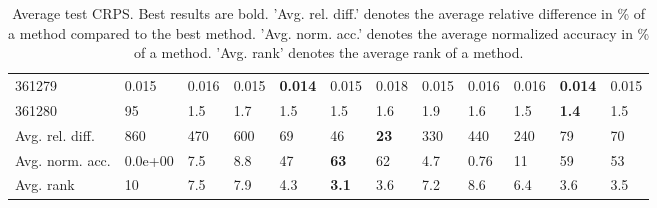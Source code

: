 \begin{table}[ht!]
\begin{tabular}{llllllllllll}
  361279 & 0.015 & 0.016 & 0.015 & \textbf{0.014} & 0.015 & 0.018 & 0.015 & 0.016 & 0.016 & \textbf{0.014} & 0.015 \\ 
  361280 & 95 & 1.5 & 1.7 & 1.5 & 1.5 & 1.6 & 1.9 & 1.6 & 1.5 & \textbf{1.4} & 1.5 \\ 
   \hline
Avg. rel. diff. & 860 & 470 & 600 & 69 & 46 & \textbf{23} & 330 & 440 & 240 & 79 & 70 \\ 
  Avg. norm. acc. & 0.0e+00 & 7.5 & 8.8 & 47 & \textbf{63} & 62 & 4.7 & 0.76 & 11 & 59 & 53 \\ 
  Avg. rank & 10 & 7.5 & 7.9 & 4.3 & \textbf{3.1} & 3.6 & 7.2 & 8.6 & 6.4 & 3.6 & 3.5 \\ 
   \hline
\hline
\end{tabular}
\endgroup
\caption{Average test CRPS. 
                  Best results are bold. 
                  'Avg. rel. diff.' denotes the average relative difference in \% of a method compared to the best method.
                  'Avg. norm. acc.' denotes the average normalized accuracy in \% of a method.
                  'Avg. rank' denotes the average rank of a method.} 
\label{table_results_CRPS}
\end{table}
